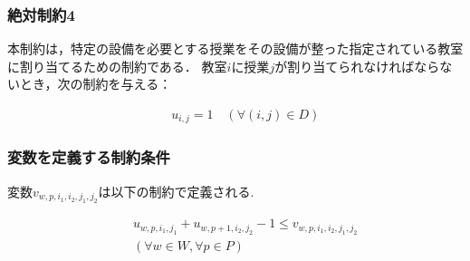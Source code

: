 \documentclass[dvipdfmx,12pt]{beamer}
\begin{document}
\begin{frame}

  \frametitle{\LARGE 絶対制約4}



\vspace{5.0mm}


本制約は，特定の設備を必要とする授業をその設備が整った指定されている教室に割り当てるための制約である．
教室$i$に授業$j$が割り当てられなければならないとき，次の制約を与える：

{\Large
\begin{eqnarray}
&&u_{i,j}=1 \quad \left(\forall (i,j) \in D\right)
\end{eqnarray}
}
\end{frame}

\begin{frame}

  \frametitle{\LARGE 変数を定義する制約条件}



\vspace{5.0mm}


変数$v_{w,p,i_1,i_2,j_1,j_2}$は以下の制約で定義される.

{\Large
\begin{eqnarray}
&&u_{w,p,i_1,j_1}+u_{w,p+1,i_2,j_2}-1 \leq v_{w,p,i_1,i_2,j_1,j_2}\\
\label{eqn:seiyaku_first} 
&& \left(\forall w \in W,\forall p \in P\right)\nonumber 
\end{eqnarray}
}


\end{frame}
\end{document}
